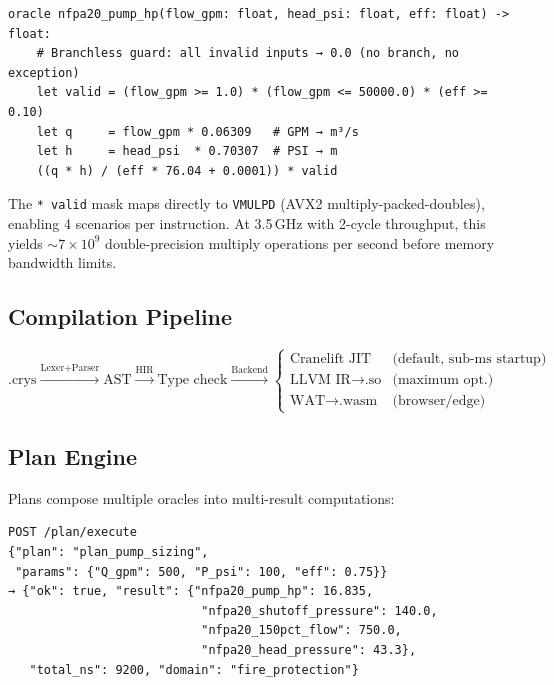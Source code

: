 \documentclass[11pt]{article}
\begin{document}
\begin{lstlisting}[caption={NFPA 20 fire pump oracle in CRYS-L}]
oracle nfpa20_pump_hp(flow_gpm: float, head_psi: float, eff: float) -> float:
    # Branchless guard: all invalid inputs → 0.0 (no branch, no exception)
    let valid = (flow_gpm >= 1.0) * (flow_gpm <= 50000.0) * (eff >= 0.10)
    let q     = flow_gpm * 0.06309   # GPM → m³/s
    let h     = head_psi  * 0.70307  # PSI → m
    ((q * h) / (eff * 76.04 + 0.0001)) * valid
\end{lstlisting}

The \texttt{* valid} mask maps directly to \texttt{VMULPD} (AVX2 multiply-packed-doubles),
enabling 4 scenarios per instruction. At 3.5\,GHz with 2-cycle throughput,
this yields $\sim\!7\times10^9$ double-precision multiply operations per second
before memory bandwidth limits.

\subsection{Compilation Pipeline}

\begin{equation}
\text{.crys} \xrightarrow{\text{Lexer+Parser}} \text{AST}
             \xrightarrow{\text{HIR}} \text{Type check}
             \xrightarrow{\text{Backend}} \begin{cases}
               \text{Cranelift JIT} & \text{(default, sub-ms startup)} \\
               \text{LLVM IR} \to \text{.so} & \text{(maximum opt.)} \\
               \text{WAT} \to \text{.wasm}   & \text{(browser/edge)}
             \end{cases}
\end{equation}

\subsection{Plan Engine}

Plans compose multiple oracles into multi-result computations:

\begin{lstlisting}[caption={REST plan execution}]
POST /plan/execute
{"plan": "plan_pump_sizing",
 "params": {"Q_gpm": 500, "P_psi": 100, "eff": 0.75}}
→ {"ok": true, "result": {"nfpa20_pump_hp": 16.835,
                           "nfpa20_shutoff_pressure": 140.0,
                           "nfpa20_150pct_flow": 750.0,
                           "nfpa20_head_pressure": 43.3},
   "total_ns": 9200, "domain": "fire_protection"}
\end{lstlisting}
\end{document}
